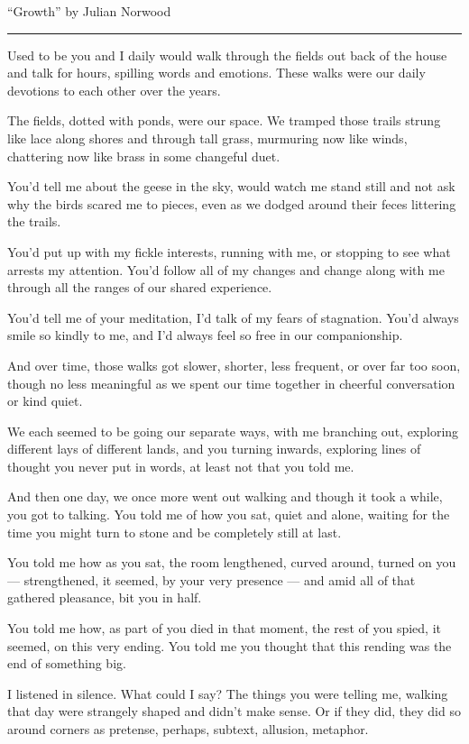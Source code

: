 ``Growth'' by Julian Norwood

\begin{center}\rule{0.5\linewidth}{\linethickness}\end{center}

Used to be you and I daily would walk through the fields out back of the house and talk for hours, spilling words and emotions. These walks were our daily devotions to each other over the years.

The fields, dotted with ponds, were our space. We tramped those trails strung like lace along shores and through tall grass, murmuring now like winds, chattering now like brass in some changeful duet.

You'd tell me about the geese in the sky, would watch me stand still and not ask why the birds scared me to pieces, even as we dodged around their feces littering the trails.

You'd put up with my fickle interests, running with me, or stopping to see what arrests my attention. You'd follow all of my changes and change along with me through all the ranges of our shared experience.

You'd tell me of your meditation, I'd talk of my fears of stagnation. You'd always smile so kindly to me, and I'd always feel so free in our companionship.

And over time, those walks got slower, shorter, less frequent, or over far too soon, though no less meaningful as we spent our time together in cheerful conversation or kind quiet.

We each seemed to be going our separate ways, with me branching out, exploring different lays of different lands, and you turning inwards, exploring lines of thought you never put in words, at least not that you told me.

And then one day, we once more went out walking and though it took a while, you got to talking. You told me of how you sat, quiet and alone, waiting for the time you might turn to stone and be completely still at last.

You told me how as you sat, the room lengthened, curved around, turned on you --- strengthened, it seemed, by your very presence --- and amid all of that gathered pleasance, bit you in half.

You told me how, as part of you died in that moment, the rest of you spied, it seemed, on this very ending. You told me you thought that this rending was the end of something big.

I listened in silence. What could I say? The things you were telling me, walking that day were strangely shaped and didn't make sense. Or if they did, they did so around corners as pretense, perhaps, subtext, allusion, metaphor.

